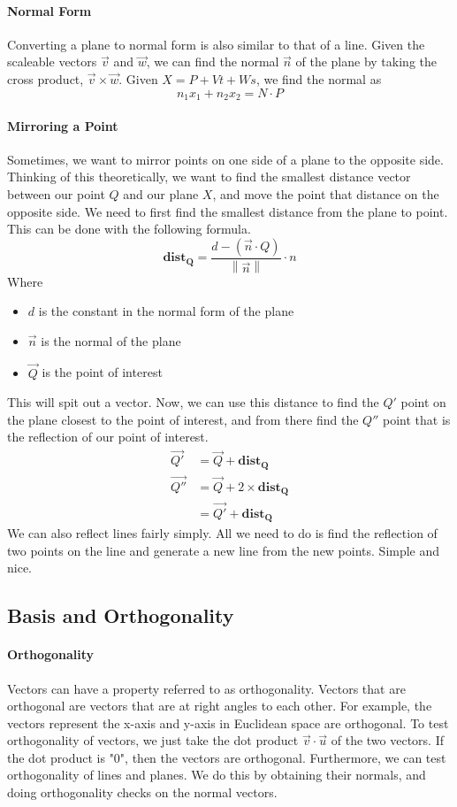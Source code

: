 \paragraph{Normal Form} Converting a plane to normal form is also similar to that of a line. Given the scaleable vectors $\vec{v}$ and $\vec{w}$, we can find the normal $\vec{n}$ of the plane by taking the cross product, $\vec{v} \times \vec{w}$. Given $X = P + Vt + Ws$, we find the normal as \[n_1x_1 + n_2x_2 = N \cdot P\]
\paragraph{Mirroring a Point} Sometimes, we want to mirror points on one side of a plane to the opposite side. Thinking of this theoretically, we want to find the smallest distance vector between our point $Q$ and our plane $X$, and move the point that distance on the opposite side. We need to first find the smallest distance from the plane to point. This can be done with the following formula. \[\mathbf{dist_Q} = \frac{d - (\vec{n} \cdot Q)}{\left\|\vec{n}\right\|} \cdot n\] Where 
\begin{itemize}
	\item $d$ is the constant in the normal form of the plane
	\item $\vec{n}$ is the normal of the plane
	\item $\vec{Q}$ is the point of interest
\end{itemize}
This will spit out a vector. Now, we can use this distance to find the $Q'$ point on the plane closest to the point of interest, and from there find the $Q''$ point that is the reflection of our point of interest.
\begin{equation}
\begin{split}
\vec{Q'} & = \vec{Q} + \mathbf{dist_Q} \\
\vec{Q''} & = \vec{Q} + 2 \times \mathbf{dist_Q} \\
& = \vec{Q'} + \mathbf{dist_Q}
\end{split}
\end{equation}
We can also reflect lines fairly simply. All we need to do is find the reflection of two points on the line and generate a new line from the new points. Simple and nice.
\subsection{Basis and Orthogonality}
\paragraph{Orthogonality} Vectors can have a property referred to as orthogonality. Vectors that are orthogonal are vectors that are at right angles to each other. For example, the vectors represent the x-axis and y-axis in Euclidean space are orthogonal. To test orthogonality of vectors, we just take the dot product $\vec{v} \cdot \vec{u}$ of the two vectors. If the dot product is "0", then the vectors are orthogonal. Furthermore, we can test orthogonality of lines and planes. We do this by obtaining their normals, and doing orthogonality checks on the normal vectors.
